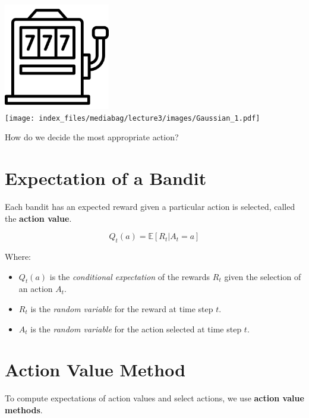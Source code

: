 \documentclass[
  letterpaper,
  DIV=11,
  numbers=noendperiod]{scrreprt}
\providecommand{\tightlist}{%
  \setlength{\itemsep}{0pt}\setlength{\parskip}{0pt}}\usepackage{longtable,booktabs,array}
\begin{document}
\includegraphics[width=1.82292in,height=1.82292in]{lecture3/images/Bandit.png}\\
\texttt{[image: index\_files/mediabag/lecture3/images/Gaussian\_1.pdf]}

\begin{tcolorbox}[enhanced jigsaw, arc=.35mm, toprule=.15mm, leftrule=.75mm, colback=white, left=2mm, colframe=quarto-callout-note-color-frame, rightrule=.15mm, opacityback=0, breakable, bottomrule=.15mm]

How do we decide the most appropriate action? 🤔

\end{tcolorbox}

\section{Expectation of a Bandit}\label{expectation-of-a-bandit}

Each bandit has an expected reward given a particular action is
selected, called the \textbf{action value}.

\[
Q_t(a) = \mathbb{E}[R_t | A_t = a]
\]

Where:

\begin{itemize}
\tightlist
\item
  \(Q_t(a)\) is the \emph{conditional expectation} of the rewards
  \(R_t\) given the selection of an action \(A_t\).
\item
  \(R_t\) is the \emph{random variable} for the reward at time step
  \(t\).
\item
  \(A_t\) is the \emph{random variable} for the action selected at time
  step \(t\).
\end{itemize}

\section{Action Value Method}\label{action-value-method}

To compute expectations of action values and select actions, we use
\textbf{action value methods}.
\end{document}
